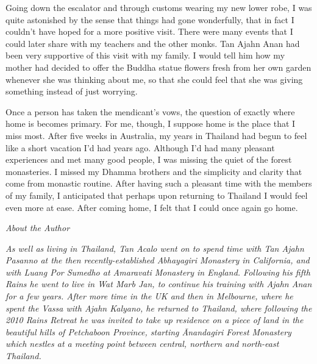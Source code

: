 Going down the escalator and through customs wearing my new lower robe, 
I was quite astonished by the sense that things had gone wonderfully, 
that in fact I couldn't have hoped for a more positive visit. There were
many events that I could later share with my teachers and the other
monks. Tan Ajahn Anan had been very supportive of this visit with my
family. I would tell him how my mother had decided to offer the Buddha
statue flowers fresh from her own garden whenever she was thinking about
me, so that she could feel that she was giving something instead of just
worrying. 

Once a person has taken the mendicant's vows, the question of exactly
where home is becomes primary. For me, though, I suppose home is the
place that I miss most. After five weeks in Australia, my years in
Thailand had begun to feel like a short vacation I'd had years ago. 
Although I'd had many pleasant experiences and met many good people, I
was missing the quiet of the forest monasteries. I missed my Dhamma
brothers and the simplicity and clarity that come from monastic routine. 
After having such a pleasant time with the members of my family, I
anticipated that perhaps upon returning to Thailand I would feel even
more at ease. After coming home, I felt that I could once again go home. 

\emph{About the Author}

\emph{As well as living in Thailand, Tan Acalo went on to spend time
with Tan Ajahn Pasanno at the then recently-established Abhayagiri
Monastery in California, and with Luang Por Sumedho at Amaravati
Monastery in England. Following his fifth Rains he went to live in Wat
Marb Jan, to continue his training with Ajahn Anan for a few years. 
After more time in the UK and then in Melbourne, where he spent the
Vassa with Ajahn Kalyano, he returned to Thailand, where following the
2010 Rains Retreat he was invited to take up residence on a piece of
land in the beautiful hills of Petchaboon Province, starting Ānandagiri
Forest Monastery which nestles at a meeting point between central, 
northern and north-east Thailand.}

